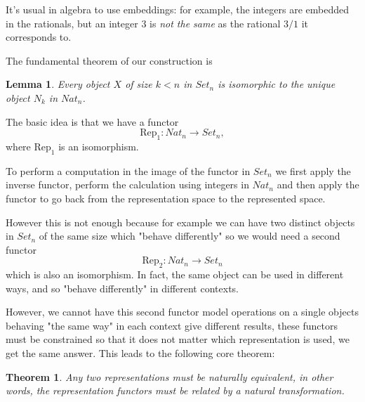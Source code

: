 \documentclass[oneside]{book}
\theoremstyle{plain}
\theoremstyle{definition}
\theoremstyle{plain}
\newtheorem{lemma}{Lemma}
\newtheorem{theorem}{Theorem}
\def\Set{\mathit{Set}}
\def\Nat{\mathit{Nat}}
\begin{document}
It's usual in algebra to use embeddings: for example, the integers are embedded
in the rationals, but an integer $3$ is {\em not the same} as the rational $3/1$ 
it corresponds to.
 
 
The fundamental theorem of our construction is
\begin{lemma}
Every object $X$ of size $k<n$ in $\mathit{Set_n}$ is isomorphic to the unique object $N_k$
in $\mathit{Nat_n}$. 
\end{lemma}

The basic idea is that we have a functor 
\begin{equation}
\mathrm{Rep_1}: \Nat_n\rightarrow \Set_n,
\end{equation}
where $\mathrm{Rep}_1$ is an isomorphism.

To perform a computation in the image of the functor in $\Set_n$ 
we first apply the inverse functor, perform the calculation using integers in $\Nat_n$
and then apply the functor to go back from the representation space to the represented space.

However this is not enough because for example we can have two distinct objects in $\Set_n$
of the same size which "behave differently" so we would need a second functor 
\begin{equation}
\mathrm{Rep_2}: \Nat_n\rightarrow \Set_n
\end{equation}
which is also an isomorphism. In fact, the same object can be used in different ways,
and so "behave differently" in different contexts.

However, we cannot have this second functor model operations on a single objects
behaving "the same way" in each context give different results, these functors
must be constrained so that it does not matter which representation is used, 
we get the same answer. This leads to the following core theorem:
\begin{theorem}
Any two representations must be naturally equivalent, in other words,
the representation functors must be related by a natural transformation.
\end{theorem}
\end{document}
